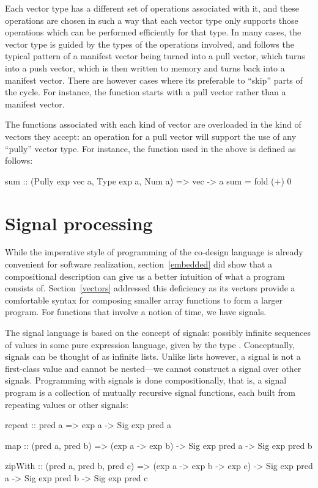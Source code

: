 \documentclass[../paper.tex]{subfiles}
\begin{document}
Each vector type has a different set of operations associated with it, and these operations are chosen in such a way that each vector type only supports those operations which can be performed efficiently for that type. In many cases, the vector type is guided by the types of the operations involved, and follows the typical pattern of a manifest vector being turned into a pull vector, which turns into a push vector, which is then written to memory and turns back into a manifest vector. There are however cases where its preferable to ``skip'' parts of the cycle. For instance, the  function starts with a pull vector rather than a manifest vector.

The functions associated with each kind of vector are overloaded in the kind of vectors they accept: an operation for a pull vector will support the use of any ``pully'' vector type. For instance, the  function used in the above  is defined as follows:

\begin{code}
sum :: (Pully exp vec a, Type exp a, Num a) => vec -> a
sum = fold (+) 0
\end{code}

\section{Signal processing}
\label{signals}

While the imperative style of programming of the co-design language is already convenient for software realization, section~\ref{embedded} did show that a compositional description can give us a better intuition of what a program consists of. Section~\ref{vectors} addressed this deficiency as its vectors provide a comfortable syntax for composing smaller array functions to form a larger program. For functions that involve a notion of time, we have signals.

The signal language is based on the concept of signals: possibly infinite sequences of values in some pure expression language, given by the type . Conceptually, signals can be thought of as infinite lists. Unlike lists however, a signal is not a first-class value and cannot be nested---we cannot construct a signal over other signals. Programming with signals is done compositionally, that is, a signal program is a collection of mutually recursive signal functions, each built from repeating values or other signals:

\begin{code}
repeat :: pred a => exp a -> Sig exp pred a

map :: (pred a, pred b) => (exp a -> exp b)
  -> Sig exp pred a -> Sig exp pred b

zipWith :: (pred a, pred b, pred c) => (exp a -> exp b -> exp c)
  -> Sig exp pred a -> Sig exp pred b -> Sig exp pred c
\end{code}
\end{document}
